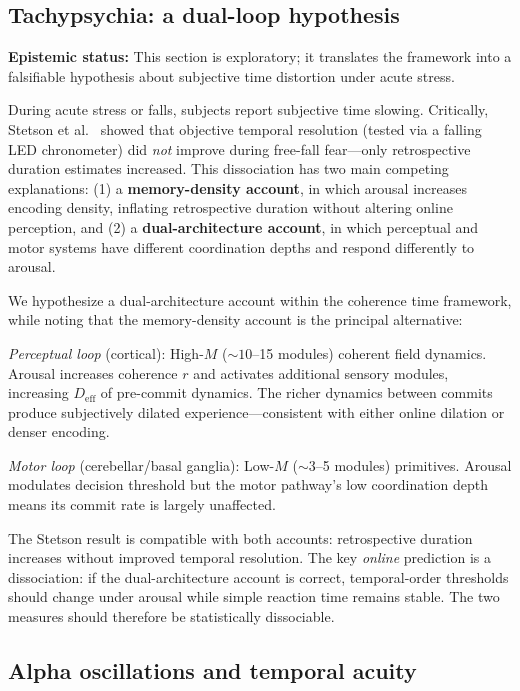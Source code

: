 \documentclass[12pt]{article}
\newcommand{\Deff}{D_{\mathrm{eff}}}
\begin{document}
\subsection{Tachypsychia: a dual-loop hypothesis}

\textbf{Epistemic status:} This section is exploratory; it translates the framework into a falsifiable hypothesis about subjective time distortion under acute stress.

During acute stress or falls, subjects report subjective time slowing. Critically, Stetson et al.~\cite{stetson2007} showed that objective temporal resolution (tested via a falling LED chronometer) did \emph{not} improve during free-fall fear---only retrospective duration estimates increased. This dissociation has two main competing explanations: (1) a \textbf{memory-density account}, in which arousal increases encoding density, inflating retrospective duration without altering online perception, and (2) a \textbf{dual-architecture account}, in which perceptual and motor systems have different coordination depths and respond differently to arousal.

We hypothesize a dual-architecture account within the coherence time framework, while noting that the memory-density account is the principal alternative:

\emph{Perceptual loop} (cortical): High-$M$ ($\sim 10$--15 modules) coherent field dynamics. Arousal increases coherence $r$ and activates additional sensory modules, increasing $\Deff$ of pre-commit dynamics. The richer dynamics between commits produce subjectively dilated experience---consistent with either online dilation or denser encoding.

\emph{Motor loop} (cerebellar/basal ganglia): Low-$M$ ($\sim 3$--5 modules) primitives. Arousal modulates decision threshold but the motor pathway's low coordination depth means its commit rate is largely unaffected.

The Stetson result is compatible with both accounts: retrospective duration increases
without improved temporal resolution. The key \emph{online} prediction is a
dissociation: if the dual-architecture account is correct, temporal-order thresholds
should change under arousal while simple reaction time remains stable. The two
measures should therefore be statistically dissociable.

\subsection{Alpha oscillations and temporal acuity}
\end{document}
